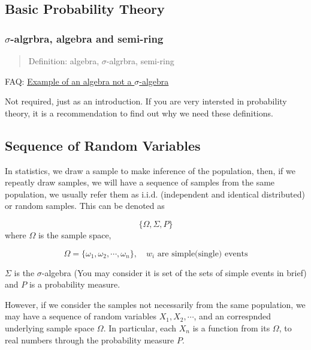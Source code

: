 \documentclass[
  letterpaper,
  DIV=11,
  numbers=noendperiod]{scrreprt}
\theoremstyle{plain}
\theoremstyle{remark}
\begin{document}
\hypertarget{basic-probability-theory}{%
\subsection{Basic Probability Theory}\label{basic-probability-theory}}

\hypertarget{sigma-algrbra-algebra-and-semi-ring}{%
\subsubsection{\texorpdfstring{\(\sigma\)-algrbra, algebra and
semi-ring}{\textbackslash sigma-algrbra, algebra and semi-ring}}\label{sigma-algrbra-algebra-and-semi-ring}}

\begin{quote}
Definition: algebra, \(\sigma\)-algrbra, semi-ring
\end{quote}

FAQ:
\href{https://math.stackexchange.com/questions/233702/example-of-an-algebra-which-is-not-a-\%CF\%83-algebra}{Example
of an algebra not a \(\sigma\)-algebra}

Not required, just as an introduction. If you are very intersted in
probability theory, it is a recommendation to find out why we need these
definitions.

\hypertarget{sequence-of-random-variables}{%
\subsection{Sequence of Random
Variables}\label{sequence-of-random-variables}}

In statistics, we draw a sample to make inference of the population,
then, if we repeatly draw samples, we will have a sequence of samples
from the same population, we usually refer them as i.i.d. (independent
and identical distributed) or random samples. This can be denoted as

\[
\{\Omega,\Sigma,P\}
\] where \(\Omega\) is the sample space,

\[
\Omega=\{\omega_1,\omega_2,\cdots, \omega_n\}, \quad w_i \text{ are simple(single) events}
\]

\(\Sigma\) is the \(\sigma\)-algebra (You may consider it is set of the
sets of simple events in brief) and \(P\) is a probability measure.

However, if we consider the samples not necessarily from the same
population, we may have a sequence of random variables
\(X_1,X_2,\cdots\), and an correspnded underlying sample space
\(\Omega\). In particular, each \(X_n\) is a function from its
\(\Omega\), to real numbers through the probability measure \(P\).
\end{document}
